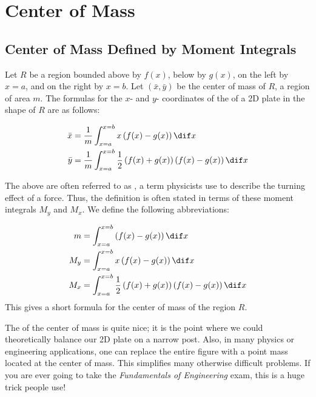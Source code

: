 
\section{Center of Mass}
\subsection{Center of Mass Defined by Moment Integrals}\label{CoM}

Let $R$ be a region bounded above by $f(x)$, below by $g(x)$, on the left by $x=a$, and on the right by $x=b$.  Let $(\bar{x},\bar{y})$ be the center of mass of $R$, a region of area $m$.  The formulas for the $x$- and $y$- coordinates of the  of a 2D plate in the shape of $R$ are as follows:

\begin{align*}
 \bar{x}&= \frac{1}{m} \int_{x=a}^{x=b} x\left(f(x)-g(x)\right) \dif x\\
 \bar{y}&= \frac{1}{m} \int_{x=a}^{x=b} \frac{1}{2}\left(f(x)+g(x)\right)\left(f(x)-g(x)\right)\dif x
\end{align*} 

\vspace{.1in}

The  above are often referred to as \emph{}, a term physicists use to describe the turning effect of a force.  Thus, the definition is often stated in terms of these moment integrals $M_y$ and $M_x$. We define the following abbreviations:

\begin{align*}
 m&=  \int_{x=a}^{x=b} \left(f(x)-g(x)\right) \dif x\\
 M_y&=  \int_{x=a}^{x=b} x\left(f(x)-g(x)\right) \dif x\\
 M_x&=  \int_{x=a}^{x=b} \frac{1}{2}\left(f(x)+g(x)\right)\left(f(x)-g(x)\right)\dif x
\end{align*} 
This gives a short formula for the center of mass of the region $R$.

The  of the center of mass is quite nice; it is the point where we could theoretically balance our 2D plate on a narrow post.  Also, in many physics or engineering applications, one can replace the entire figure with a point mass located at the center of mass.  This simplifies many otherwise difficult problems.  If you are ever going to take the \emph{Fundamentals of Engineering} exam, this is a huge trick people use!

